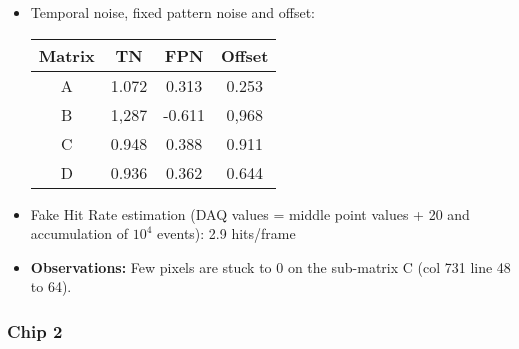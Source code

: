 \documentclass[a4papper, 10pt]{article}
\begin{document}
\begin{itemize}
          \item Temporal noise, fixed pattern noise and offset:

            \begin{center}
              \begin{tabular}{|c|c|c|c|}
                \hline %
         \rowcolor{light-gray}         Matrix  &  TN   &  FPN  &  Offset  \tabularnewline
                \hline %
                    A     & 1.072 & 0.313 & 0.253    \tabularnewline
                \hline %
                    B     & 1,287 & -0.611 & 0,968   \tabularnewline
                \hline %
                    C     & 0.948 & 0.388 & 0.911   \tabularnewline
                \hline %
                    D     & 0.936 & 0.362 & 0.644    \tabularnewline
                \hline %
              \end{tabular}
            \end{center}
        
        \item Fake Hit Rate estimation (DAQ values = middle point values + 20 and accumulation of $10^4$ events): 2.9 hits/frame
         
        \item \textbf{Observations:} Few pixels are stuck to 0 on the sub-matrix C (col 731 line 48 to 64).
        
        \end{itemize}

             \subsubsection{Chip 2}
\end{document}
